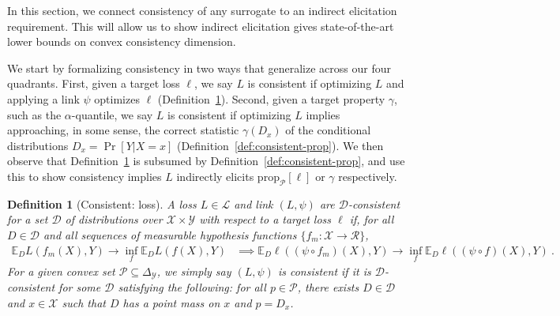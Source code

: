 \documentclass[11pt]{article} %
\newcommand{\Comments}{1}
\newcommand{\mynote}[2]{\ifnum\Comments=1\textcolor{#1}{#2}\fi}
\newcommand{\mytodo}[2]{\ifnum\Comments=1%
	\todo[linecolor=#1!80!black,backgroundcolor=#1,bordercolor=#1!80!black]{#2}\fi}
\newcommand{\raft}[1]{\mytodo{green!20!white}{RF: #1}}
\newcommand{\jessie}[1]{\mynote{teal}{[JF: #1]}}
\newcommand{\simplex}{\Delta_\Y}
\newcommand{\prop}[2][\mathcal{P}]{\mathrm{prop}_{#1}[#2]}
\newcommand{\D}{\mathcal{D}}
\newcommand{\E}{\mathbb{E}}
\renewcommand{\L}{\mathcal{L}}
\newcommand{\R}{\mathcal{R}}
\renewcommand{\P}{\mathcal{P}}
\newcommand{\X}{\mathcal{X}}
\newcommand{\Y}{\mathcal{Y}}
\newtheorem{definition}{Definition}
\begin{document}
In this section, we connect consistency of any surrogate to an indirect elicitation requirement.
This will allow us to show indirect elicitation gives state-of-the-art lower bounds on convex consistency dimension.

We start by formalizing consistency in two ways that generalize across our four quadrants.
First, given a target loss $\ell$, we say $L$ is consistent if optimizing $L$ and applying a link $\psi$ optimizes $\ell$ (Definition~\ref{def:consistent-ell}).
Second, given a target property $\gamma$, such as the $\alpha$-quantile, we say $L$ is consistent if optimizing $L$ implies approaching, in some sense, the correct statistic $\gamma(D_x)$ of the conditional distributions $D_x = \Pr[Y|X=x]$ (Definition~\ref{def:consistent-prop}).
We then observe that Definition~\ref{def:consistent-ell} is subsumed by Definition~\ref{def:consistent-prop}, and use this to show consistency implies $L$ indirectly elicits $\prop{\ell}$ or $\gamma$ respectively.

\begin{definition}[Consistent: loss]\label{def:consistent-ell}
	A loss $L \in \L$ and link $(L,\psi)$ are \emph{$\D$-consistent} for a set $\D$ of distributions over $\X \times \Y$ with respect to a target loss $\ell$ if, for all $D \in \D$ and all sequences of measurable hypothesis functions $\{f_m : \X \to \R\}$,
	\begin{align*}
	\E_D L(f_m(X), Y) \to \inf_f \E_D L(f(X), Y) &\implies \E_D \ell((\psi \circ f_m)(X), Y) \to \inf_f \E_D \ell((\psi \circ f)(X), Y)~.~
	\end{align*}
	For a given convex set $\P \subseteq \simplex$, we simply say $(L,\psi)$ is \emph{consistent} if it is $\D$-consistent for some $\D$ satisfying the following: for all $p \in \P$, there exists $D \in \D$ and $x \in \X$ such that $D$ has a point mass on $x$ and $p = D_x$.
\end{definition}
\end{document}
